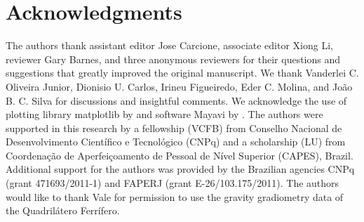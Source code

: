 \newpage
\section{Acknowledgments}

The authors thank assistant editor Jose Carcione,
associate editor Xiong Li,
reviewer Gary Barnes, and three anonymous reviewers for their questions
and suggestions that greatly improved the original manuscript.
We thank Vanderlei C. Oliveira Junior,
Dionisio U. Carlos,
Irineu Figueiredo,
Eder C. Molina, and
Jo\~ao B. C. Silva for discussions and insightful comments.
We acknowledge the use of plotting library matplotlib by \citet{matplotlib} and
software Mayavi by \citet{mayavi}.
The authors were supported in this research by
a fellowship (VCFB) from
Conselho Nacional de Desenvolvimento Cient\'ifico e Tecnol\'ogico (CNPq) and
a scholarship (LU) from
Coordena\c{c}\~ao de Aperfei\c{c}oamento de Pessoal de N\'ivel Superior (CAPES),
Brazil.
Additional support for the authors was provided by
the Brazilian agencies CNPq (grant 471693/2011-1) and
FAPERJ (grant E-26/103.175/2011).
The authors would like to thank Vale for permission to use the gravity
gradiometry data of the Quadril\'atero Ferr\'ifero.

